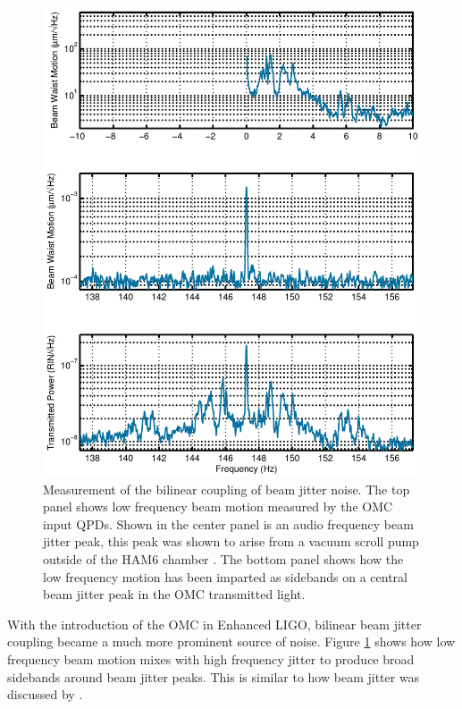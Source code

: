\begin{figure}
  \begin{center}
  \leavevmode
  \includegraphics{figs-jitter/bilinearplot.pdf}
  \end{center}
  \caption[Measurement of the bilinear coupling of beam jitter noise.]{Measurement of the bilinear coupling of beam jitter noise. The top panel shows low frequency beam motion measured by the OMC input QPDs. Shown in the center panel is an audio frequency beam jitter peak, this peak was shown to arise from a vacuum scroll pump outside of the HAM6 chamber \cite{robert147}. The bottom panel shows how the low frequency motion has been imparted as sidebands on a central beam jitter peak in the OMC transmitted light.}
  \label{fig:bilinear}
\end{figure}

With the introduction of the OMC in Enhanced LIGO, bilinear beam jitter coupling became a much more prominent source of noise. %
Figure \ref{fig:bilinear} shows how low frequency beam motion mixes with high frequency jitter to produce broad sidebands around beam jitter peaks. %
This is similar to how beam jitter was discussed by \citet{Tobin}.

